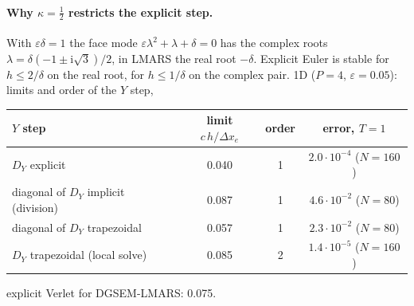 \documentclass[11pt,a4paper]{article}
\begin{document}
\paragraph{Why $\kappa=\tfrac12$ restricts the explicit step.} With $\varepsilon\delta=1$ the face mode $\varepsilon\lambda^2+\lambda+\delta=0$ has the complex roots
$\lambda=\delta(-1\pm\mathrm i\sqrt3)/2$, in LMARS the real root $-\delta$. Explicit Euler is stable for $h\le2/\delta$ on the real root, for $h\le1/\delta$ on the complex pair.
1D ($P=4$, $\varepsilon=0.05$): limits and order of the $Y$ step,
\begin{center}\small
\begin{tabular}{lccc}\toprule
$Y$ step & limit $c\,h/\Delta x_e$ & order & error, $T=1$\\\midrule
$D_Y$ explicit & 0.040 & 1 & $2.0\cdot10^{-4}$ ($N=160$)\\
diagonal of $D_Y$ implicit (division) & 0.087 & 1 & $4.6\cdot10^{-2}$ ($N=80$)\\
diagonal of $D_Y$ trapezoidal & 0.057 & 1 & $2.3\cdot10^{-2}$ ($N=80$)\\
$D_Y$ trapezoidal (local solve) & 0.085 & 2 & $1.4\cdot10^{-5}$ ($N=160$)\\\bottomrule
\end{tabular}
\end{center}
explicit Verlet for DGSEM-LMARS: 0.075.
\end{document}
